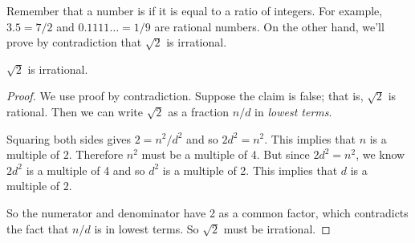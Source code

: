 Remember that a number is  if it is equal to a ratio
of integers.  For example, $3.5 = 7/2$ and $0.1111\dots = 1/9$ are
rational numbers.  On the other hand, we'll prove by contradiction
that $\sqrt{2}$ is irrational.

\begin{theorem}
$\sqrt{2}$ is irrational.
\end{theorem}

\begin{proof}
We use proof by contradiction.  Suppose the claim is false; that is,
$\sqrt{2}$ is rational.  Then we can write $\sqrt{2}$ as a fraction
$n/d$ in \textit{lowest terms}.

Squaring both sides gives $2 = n^2 / d^2$ and so $2 d^2 = n^2$.  This
implies that $n$ is a multiple of $2$.  Therefore $n^2$ must be a multiple
of 4.  But since $2d^2 = n^2$, we know $2 d^2$ is a multiple of 4 and so
$d^2$ is a multiple of 2.  This implies that $d$ is a multiple of $2$.

So the numerator and denominator have 2 as a common factor, which
contradicts the fact that $n/d$ is in lowest terms.  So $\sqrt{2}$ must be
irrational.
\end{proof}

